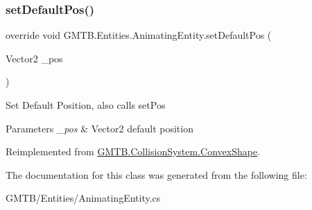 \subsubsection{\texorpdfstring{setDefaultPos()}{setDefaultPos()}}
{\footnotesize\ttfamily override void G\+M\+T\+B.\+Entities.\+Animating\+Entity.\+set\+Default\+Pos (\begin{DoxyParamCaption}\item[{Vector2}]{\+\_\+pos }\end{DoxyParamCaption})\hspace{0.3cm}{\ttfamily [virtual]}}



Set Default Position, also calls set\+Pos 


\begin{DoxyParams}{Parameters}
{\em \+\_\+pos} & Vector2 default position\\
\hline
\end{DoxyParams}


Reimplemented from \mbox{\hyperlink{class_g_m_t_b_1_1_collision_system_1_1_convex_shape_ab31e50bc6e7ae58970eb512355608184}{G\+M\+T\+B.\+Collision\+System.\+Convex\+Shape}}.



The documentation for this class was generated from the following file\+:\begin{DoxyCompactItemize}
\item 
G\+M\+T\+B/\+Entities/Animating\+Entity.\+cs\end{DoxyCompactItemize}
